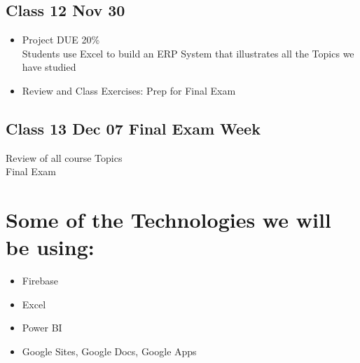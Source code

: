 \subsection{    Class 12 Nov 30}
\begin{itemize}
    \item  Project  DUE     20\%   \\ Students use Excel to build an ERP System that illustrates all the Topics we have studied\newline
    \item    Review and Class Exercises: Prep for Final Exam  \\
\end{itemize}      
      
\subsection{Class 13 Dec 07 Final Exam Week}
Review of all course Topics \\
Final Exam



\section * {  Some of the Technologies we will be using:}
\begin{itemize}
    \item Firebase
    \item Excel    
    \item Power BI  
    \item Google Sites, Google Docs, Google Apps    
\end{itemize}
    
    
    
    